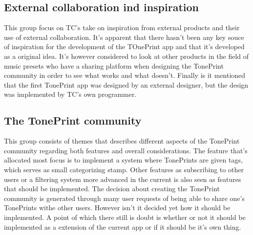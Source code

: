 \subsection*{External collaboration ind inspiration}
This group focus on TC's take on inspiration from external products and their use of external collaboration. It's apparent that there hasn't been any key souce of inspiration for the development of the TOnePrint app and that it's developed as a original idea. It's however considered to look at other products in the field of music presets who have a sharing platform when designing the TonePrint community in order to see what works and what doesn't. Finally is it mentioned that the first TonePrint app was designed by an external designer, but the design was implemented by TC's own programmer.  


\subsection*{The TonePrint community}
This group consists of themes that describes different aspects of the TonePrint community regarding both features and overall considerations. The feature that's allocated most focus is to implement a system where TonePrints are given tags, which serves as small categorizing stamp. Other features as subscribing to other users or a filtering system more advanced in the current is also seen as features that should be implemented. The decision about creating the TonePrint community is generated through many user requests of being able to share one's TonePrints withe other users. However isn't it decided yet how it should be implemented. A point of which there still is doubt is whether or not it should be implemented as a extension of the current app or if it should be it's own thing.


